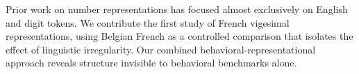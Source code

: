 Prior work on number representations has focused almost exclusively on English and digit tokens.
We contribute the first study of French vigesimal representations, using Belgian French as a controlled comparison that isolates the effect of linguistic irregularity.
Our combined behavioral-representational approach reveals structure invisible to behavioral benchmarks alone.
